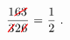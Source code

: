 \documentclass{standalone}
\newcommand{\cancel}[1]{%
	\tikz[baseline=(tocancel.base)]{
		\node[inner sep=0pt,outer sep=0pt] (tocancel) {#1};
		\draw[red,thick,line cap=round] (tocancel.south west) -- (tocancel.north east);
	}%
}%
\begin{document}
$
\begin{array}{@{}r@{\,\,}c@{\,\,}l@{}}
	\displaystyle\frac{1\cancel{63}}{\cancel{3}2\cancel{6}}&=&\displaystyle\frac{1}{2}~.
\end{array}
$
\end{document}
